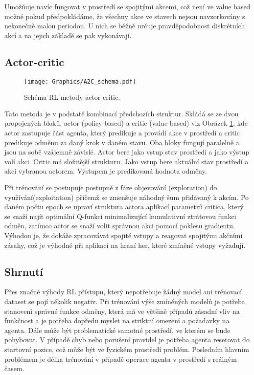 \documentclass[czech, bc, kky, he, iso690numb]{fasthesis}
\begin{document}
	            Umožňuje navíc fungovat v prostředí se spojitými akcemi, což není ve value based možné pokud předpokládáme, že všechny akce ve stavech nejsou navzorkovány s nekonečně malou periodou. U nich se běžně určuje pravděpodobnost diskrétních akcí a na jejich základě se pak vykonávají.
            
            \subsection{Actor-critic}
            		
            		\begin{figure}[h]
            			\centering
            			\texttt{[image: Graphics/A2C\_schema.pdf]}
            			\caption{Schéma RL metody actor-critic.}
            			\label{pic:actor_critic}
            		\end{figure}
            		
	            Tato metoda je v podstatě kombinací předchozích struktur. Skládá se ze dvou propojených bloků, actor (policy-based) a critic (value-based) viz Obrázek \ref{pic:actor_critic}, kde actor zastupuje část agenta, který predikuje a provádí akce v prostředí a critic predikuje odměnu za daný krok v daném stavu. Oba bloky fungují paralelně a jsou na sobě vzájemně závislé. Actor bere jako vstup stav prostředí a jako výstup volí akci. Critic má složitější strukturu. Jako vstup bere aktuální stav prostředí a akci vybranou actorem. Výstupem je predikovaná hodnota odměny.
	            
	            Při trénování se postupuje postupně z fáze objevování (exploration) do využívání(exploitation) přičemž se zmenšuje náhodný šum přidávaný k akcím. Po daném počtu epoch se upraví struktura actora aplikací parametrů critica, který se snaží najít optimální Q-funkci minimalizující kumulativní ztrátovou funkci odměn, zatímco actor se snaží volit správnou akci pomocí poklesu gradientu. Výhodou je, že dokáže zpracovávat spojité vstupy a reagovat spojitými akčními zásahy, což je výhodné při aplikaci na hraní her, které zmíněné vstupy vyžadují.
	            
        	\subsection{Shrnutí}
        		Přes značné výhody RL přístupu, který nepotřebuje žádný model ani trénovací dataset se pojí několik negativ. Při trénování výše zmíněných modelů je potřeba stanovení správné funkce odměny, která má ve většině případů zásadní vliv na funkčnost a je potřeba dopředu myslet na striktní omezení a požadavky na agenta. Dále může být problematické samotné prostředí, ve kterém se bude pohybovat. V případě chyb nebo porušení pravidel je potřeba agenta resetovat do startovní pozice, což může být ve fyzickém prostředí problém. Posledním hlavním problémem je délka trénování v případě operace agenta v prostředí s reálným časem.
            
\end{document}
